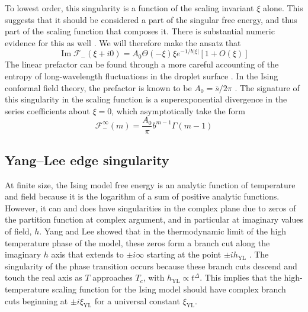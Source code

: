 \documentclass[
aps,
pre,
preprint,
longbibliography,
floatfix
]{revtex4-2}
\begin{document}
To lowest order, this singularity is a function of the scaling invariant $\xi$
alone. This suggests that it should be considered a part of the
singular free energy, and thus part of the scaling function that composes
it. There is substantial numeric evidence for this as well
\cite{Enting_1980_An, Fonseca_2003_Ising}. We will therefore make the ansatz
that
\begin{equation} \label{eq:essential.singularity}
  \operatorname{Im}\mathcal F_-(\xi+i0)=A_0\Theta(-\xi)\xi e^{-1/b|\xi|}\left[1+O(\xi)\right]
\end{equation}
The linear prefactor can be found through a more careful accounting of the
entropy of long-wavelength fluctuations in the droplet surface
\cite{Gunther_1980_Goldstone, Houghton_1980_The}. In the Ising conformal field
theory, the prefactor is known to be $A_0=\bar s/2\pi$
\cite{Voloshin_1985_Decay, Fonseca_2003_Ising}. The signature of this
singularity in the scaling function is a superexponential divergence in the
series coefficients about $\xi=0$, which asymptotically take the form
\begin{equation} \label{eq:low.asymptotic}
  \mathcal F_-^\infty(m)=\frac{A_0}\pi b^{m-1}\Gamma(m-1)
\end{equation}

\subsection{Yang--Lee edge singularity}

At finite size, the Ising model free energy is an analytic function of
temperature and field because it is the logarithm of a sum of positive analytic
functions. However, it can and does have singularities in the complex plane due
to zeros of the partition function at complex argument, and in particular at
imaginary values of field, $h$. Yang and Lee showed that in the thermodynamic
limit of the high temperature phase of the model, these zeros form a branch cut
along the imaginary $h$ axis that extends to $\pm i\infty$ starting at the
point $\pm ih_{\mathrm{YL}}$ \cite{Yang_1952_Statistical, Lee_1952_Statistical}.
The singularity of the phase transition occurs because these branch cuts
descend and touch the real axis as $T$ approaches $T_c$, with
$h_{\mathrm{YL}}\propto t^{\Delta}$. This implies that the
high-temperature scaling function for the Ising model should have complex
branch cuts beginning at $\pm i\xi_{\mathrm{YL}}$ for a universal constant
$\xi_{\mathrm{YL}}$.
\end{document}

